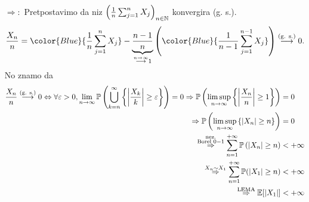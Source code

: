 \documentclass{article}
\newcommand{\mylimsup}{\underset{n\to\infty}{\lim\sup}}
\begin{document}
\begin{itemize}
    \item[\(\boxed{\Rightarrow}:\)] Pretpostavimo da niz \(\left(\frac1n\sum_{j=1}^nX_j\right)_{n\in\Bbb N}\) konvergira (g. s.). \[\frac{X_n}n={\color{Blue}{\frac1n\sum_{j=1}^nX_j}}-\underbrace{\frac{n-1}n}_{\overset{n\to\infty}{\longrightarrow}1}\left({\color{Blue}{\frac1{n-1}\sum_{j=1}^{n-1}X_j}}\right)\overset{\text{(g. s.)}}{\longrightarrow}0.\] No znamo da \[\begin{aligned}\frac{X_n}n\overset{\text{(g. s.)}}{\longrightarrow} 0\Leftrightarrow\forall\varepsilon>0,\lim_{n\to\infty}\Bbb P\left(\bigcup_{k=n}^\infty\left\{\left|\frac{X_k}k\right|\ge\varepsilon\right\}\right)=0\Rightarrow \Bbb P\left(\mylimsup \left\{\left|\frac{X_n}n\right|\ge 1\right\}\right)&=0\\\Rightarrow \Bbb P\left(\mylimsup \left\{|X_n|\ge n\right\}\right)&=0\\\overset{\substack{\text{nez.}\\\text{Borel }0-1}}{\Rightarrow}\sum_{n=1}^{+\infty}\Bbb P\left(|X_n|\ge n\right)&<+\infty\\\overset{X_n\sim X_1}{\Rightarrow}\sum_{n=1}^{+\infty}\Bbb P(|X_1|\ge n)&<+\infty\\\overset{\substack{\text{LEMA}}}{\Rightarrow}\Bbb E[|X_1|]&<+\infty\end{aligned}\] 

\end{itemize}
\end{document}

